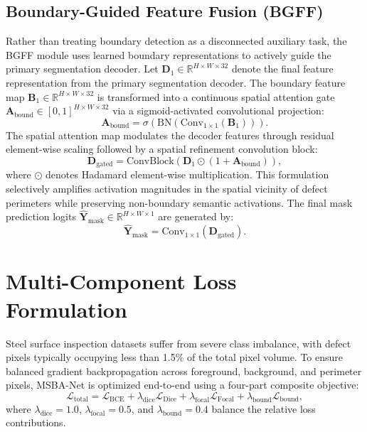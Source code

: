 \documentclass{ieeeaccess}
\begin{document}
\subsection{Boundary-Guided Feature Fusion (BGFF)}
\label{sec:bgff_module}
Rather than treating boundary detection as a disconnected auxiliary task, the BGFF module uses learned boundary representations to actively guide the primary segmentation decoder. Let $\mathbf{D}_1 \in \mathbb{R}^{H \times W \times 32}$ denote the final feature representation from the primary segmentation decoder. The boundary feature map $\mathbf{B}_1 \in \mathbb{R}^{H \times W \times 32}$ is transformed into a continuous spatial attention gate $\mathbf{A}_{\text{bound}} \in [0, 1]^{H \times W \times 32}$ via a sigmoid-activated convolutional projection:
\begin{equation}
  \mathbf{A}_{\text{bound}} = \sigma\left(\text{BN}\left(\text{Conv}_{1 \times 1}(\mathbf{B}_1)\right)\right).
\end{equation}
The spatial attention map modulates the decoder features through residual element-wise scaling followed by a spatial refinement convolution block:
\begin{equation}
  \mathbf{D}_{\text{gated}} = \text{ConvBlock}\left(\mathbf{D}_1 \odot \left(1 + \mathbf{A}_{\text{bound}}\right)\right),
\end{equation}
where $\odot$ denotes Hadamard element-wise multiplication. This formulation selectively amplifies activation magnitudes in the spatial vicinity of defect perimeters while preserving non-boundary semantic activations. The final mask prediction logits $\hat{\mathbf{Y}}_{\text{mask}} \in \mathbb{R}^{H \times W \times 1}$ are generated by:
\begin{equation}
  \hat{\mathbf{Y}}_{\text{mask}} = \text{Conv}_{1 \times 1}(\mathbf{D}_{\text{gated}}).
\end{equation}

\section{Multi-Component Loss Formulation}
\label{sec:loss_formulation}
Steel surface inspection datasets suffer from severe class imbalance, with defect pixels typically occupying less than 1.5\% of the total pixel volume. To ensure balanced gradient backpropagation across foreground, background, and perimeter pixels, MSBA-Net is optimized end-to-end using a four-part composite objective:
\begin{equation}
  \mathcal{L}_{\text{total}} = \mathcal{L}_{\text{BCE}} + \lambda_{\text{dice}}\mathcal{L}_{\text{Dice}} + \lambda_{\text{focal}}\mathcal{L}_{\text{Focal}} + \lambda_{\text{bound}}\mathcal{L}_{\text{bound}},
  \label{eq:total_loss}
\end{equation}
where $\lambda_{\text{dice}} = 1.0$, $\lambda_{\text{focal}} = 0.5$, and $\lambda_{\text{bound}} = 0.4$ balance the relative loss contributions.
\end{document}
